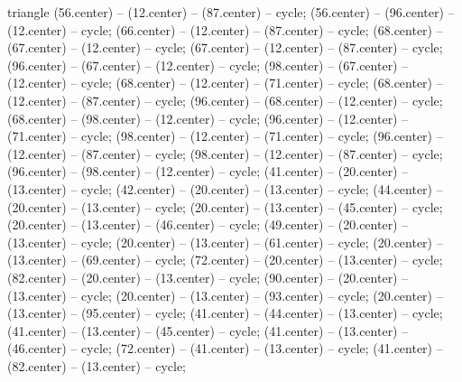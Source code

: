 \begin{pgfonlayer}{triangle}
 (56.center) -- (12.center) -- (87.center) -- cycle; 
 (56.center) -- (96.center) -- (12.center) -- cycle; 
 (66.center) -- (12.center) -- (87.center) -- cycle; 
 (68.center) -- (67.center) -- (12.center) -- cycle; 
 (67.center) -- (12.center) -- (87.center) -- cycle; 
 (96.center) -- (67.center) -- (12.center) -- cycle; 
 (98.center) -- (67.center) -- (12.center) -- cycle; 
 (68.center) -- (12.center) -- (71.center) -- cycle; 
 (68.center) -- (12.center) -- (87.center) -- cycle; 
 (96.center) -- (68.center) -- (12.center) -- cycle; 
 (68.center) -- (98.center) -- (12.center) -- cycle; 
 (96.center) -- (12.center) -- (71.center) -- cycle; 
 (98.center) -- (12.center) -- (71.center) -- cycle; 
 (96.center) -- (12.center) -- (87.center) -- cycle; 
 (98.center) -- (12.center) -- (87.center) -- cycle; 
 (96.center) -- (98.center) -- (12.center) -- cycle; 
 (41.center) -- (20.center) -- (13.center) -- cycle; 
 (42.center) -- (20.center) -- (13.center) -- cycle; 
 (44.center) -- (20.center) -- (13.center) -- cycle; 
 (20.center) -- (13.center) -- (45.center) -- cycle; 
 (20.center) -- (13.center) -- (46.center) -- cycle; 
 (49.center) -- (20.center) -- (13.center) -- cycle; 
 (20.center) -- (13.center) -- (61.center) -- cycle; 
 (20.center) -- (13.center) -- (69.center) -- cycle; 
 (72.center) -- (20.center) -- (13.center) -- cycle; 
 (82.center) -- (20.center) -- (13.center) -- cycle; 
 (90.center) -- (20.center) -- (13.center) -- cycle; 
 (20.center) -- (13.center) -- (93.center) -- cycle; 
 (20.center) -- (13.center) -- (95.center) -- cycle; 
 (41.center) -- (44.center) -- (13.center) -- cycle; 
 (41.center) -- (13.center) -- (45.center) -- cycle; 
 (41.center) -- (13.center) -- (46.center) -- cycle; 
 (72.center) -- (41.center) -- (13.center) -- cycle; 
 (41.center) -- (82.center) -- (13.center) -- cycle; 

\end{pgfonlayer}

